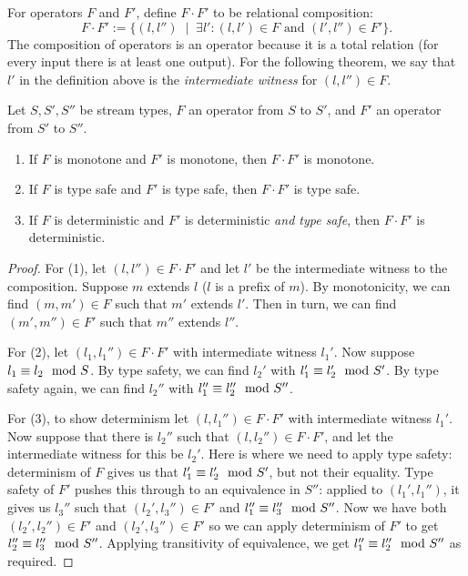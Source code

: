 For operators $F$ and $F'$, define $F \cdot F'$ to be relational composition:
\[
F \cdot F' := \big\{ (l, l'') \;\mid\; \exists l': (l, l') \in F \text{ and } (l', l'') \in F' \big\}.
\]
The composition of operators is an operator because it is a total relation (for every input there is at least one output).
For the following theorem, we say that $l'$ in the definition above is the \emph{intermediate witness} for $(l, l'') \in F$.

\begin{proposition}
Let $S, S', S''$ be stream types, $F$ an operator from $S$ to $S'$, and $F'$ an operator from $S'$ to $S''$.
\begin{enumerate}
  \item If $F$ is monotone and $F'$ is monotone, then $F \cdot F'$ is monotone.
  \item If $F$ is type safe and $F'$ is type safe, then $F \cdot F'$ is type safe.
  \item If $F$ is deterministic and $F'$ is deterministic \emph{and type safe}, then $F \cdot F'$ is deterministic.
\end{enumerate}
\end{proposition}
\begin{proof}
For (1), let $(l, l'') \in F \cdot F'$ and let $l'$ be the intermediate witness to the composition. Suppose $m$ extends $l$ ($l$ is a prefix of $m$). By monotonicity, we can find $(m, m') \in F$ such that $m'$ extends $l'$. Then in turn, we can find $(m', m'') \in F'$ such that $m''$ extends $l''$.

For (2), let $(l_1, l_1'') \in F \cdot F'$ with intermediate witness $l_1'$.
Now suppose $l_1 \equiv l_2 \mod {S}$.
By type safety, we can find $l_2'$ with $l_1' \equiv l_2' \mod {S'}$.
By type safety again, we can find $l_2''$ with $l_1'' \equiv l_2'' \mod {S''}$.

For (3), to show determinism let $(l, l_1'') \in F \cdot F'$ with intermediate witness $l_1'$.
Now suppose that there is $l_2''$ such that
$(l, l_2'') \in F \cdot F'$, and let the intermediate witness for this be $l_2'$. Here is where we need to apply type safety: determinism of $F$ gives us that $l_1' \equiv l_2' \mod {S'}$, but not their equality.
Type safety of $F'$ pushes this through to an equivalence in $S''$:
applied to $(l_1', l_1'')$, it gives us $l_3''$ such that $(l_2', l_3'') \in F'$ and $l_1'' \equiv l_3'' \mod {S''}$.
Now we have both $(l_2', l_2'') \in F'$ and $(l_2', l_3'') \in F'$ so we can apply determinism of $F'$ to get $l_2'' \equiv l_3'' \mod {S''}$.
Applying transitivity of equivalence, we get
$l_1'' \equiv l_2'' \mod {S''}$ as required.
\end{proof}

